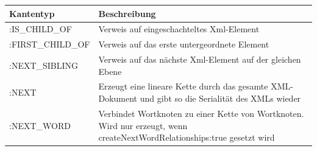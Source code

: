 \documentclass[ngerman,]{scrreprt}
\begin{document}
\begin{longtable}[]{@{}ll@{}}
\toprule
\begin{minipage}[b]{0.32\columnwidth}\raggedright\strut
Kantentyp\strut
\end{minipage} & \begin{minipage}[b]{0.62\columnwidth}\raggedright\strut
Beschreibung\strut
\end{minipage}\tabularnewline
\midrule
\endhead
\begin{minipage}[t]{0.32\columnwidth}\raggedright\strut
:IS\_CHILD\_OF\strut
\end{minipage} & \begin{minipage}[t]{0.62\columnwidth}\raggedright\strut
Verweis auf eingeschachteltes Xml-Element\strut
\end{minipage}\tabularnewline
\begin{minipage}[t]{0.32\columnwidth}\raggedright\strut
:FIRST\_CHILD\_OF\strut
\end{minipage} & \begin{minipage}[t]{0.62\columnwidth}\raggedright\strut
Verweis auf das erste untergeordnete Element\strut
\end{minipage}\tabularnewline
\begin{minipage}[t]{0.32\columnwidth}\raggedright\strut
:NEXT\_SIBLING\strut
\end{minipage} & \begin{minipage}[t]{0.62\columnwidth}\raggedright\strut
Verweis auf das nächste Xml-Element auf der gleichen Ebene\strut
\end{minipage}\tabularnewline
\begin{minipage}[t]{0.32\columnwidth}\raggedright\strut
:NEXT\strut
\end{minipage} & \begin{minipage}[t]{0.62\columnwidth}\raggedright\strut
Erzeugt eine lineare Kette durch das gesamte XML-Dokument und gibt so die Serialität des XMLs wieder\strut
\end{minipage}\tabularnewline
\begin{minipage}[t]{0.32\columnwidth}\raggedright\strut
:NEXT\_WORD\strut
\end{minipage} & \begin{minipage}[t]{0.62\columnwidth}\raggedright\strut
Verbindet Wortknoten zu einer Kette von Wortknoten. Wird nur erzeugt, wenn createNextWordRelationships:true gesetzt wird\strut
\end{minipage}\tabularnewline
\bottomrule
\end{longtable}
\end{document}
